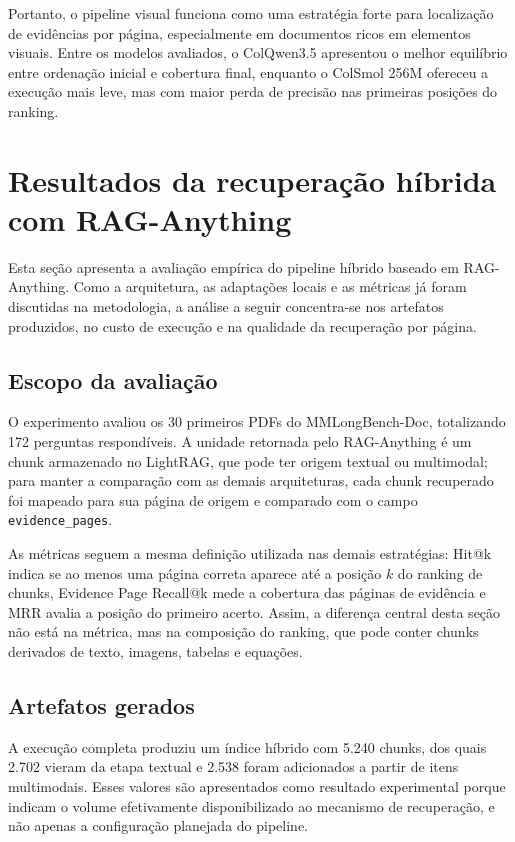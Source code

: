Portanto, o pipeline visual funciona como uma estratégia forte para localização de evidências por página, especialmente em documentos ricos em elementos visuais. Entre os modelos avaliados, o ColQwen3.5 apresentou o melhor equilíbrio entre ordenação inicial e cobertura final, enquanto o ColSmol 256M ofereceu a execução mais leve, mas com maior perda de precisão nas primeiras posições do ranking.


\section{Resultados da recuperação híbrida com RAG-Anything}
\label{sec:resultados-raganything}

Esta seção apresenta a avaliação empírica do pipeline híbrido baseado em RAG-Anything. Como a arquitetura, as adaptações locais e as métricas já foram discutidas na metodologia, a análise a seguir concentra-se nos artefatos produzidos, no custo de execução e na qualidade da recuperação por página.

\subsection{Escopo da avaliação}
\label{subsec:raganything-visao-geral}

O experimento avaliou os 30 primeiros PDFs do MMLongBench-Doc, totalizando 172 perguntas respondíveis. A unidade retornada pelo RAG-Anything é um chunk armazenado no LightRAG, que pode ter origem textual ou multimodal; para manter a comparação com as demais arquiteturas, cada chunk recuperado foi mapeado para sua página de origem e comparado com o campo \texttt{evidence\_pages}.

As métricas seguem a mesma definição utilizada nas demais estratégias: Hit@k indica se ao menos uma página correta aparece até a posição $k$ do ranking de chunks, Evidence Page Recall@k mede a cobertura das páginas de evidência e MRR avalia a posição do primeiro acerto. Assim, a diferença central desta seção não está na métrica, mas na composição do ranking, que pode conter chunks derivados de texto, imagens, tabelas e equações.

\subsection{Artefatos gerados}
\label{subsec:raganything-artefatos}

A execução completa produziu um índice híbrido com 5.240 chunks, dos quais 2.702 vieram da etapa textual e 2.538 foram adicionados a partir de itens multimodais. Esses valores são apresentados como resultado experimental porque indicam o volume efetivamente disponibilizado ao mecanismo de recuperação, e não apenas a configuração planejada do pipeline.

